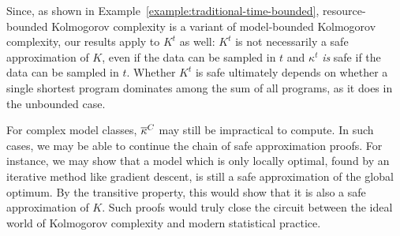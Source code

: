 Since, as shown in Example~\ref{example:traditional-time-bounded}, resource-bounded Kolmogorov complexity is a variant of model-bounded Kolmogorov complexity, our results apply to $K^t$ as well: $K^t$ is not necessarily a safe approximation of $K$, even if the data can be sampled in $t$ and $\kappa^t$ \emph{is} safe if the data can be sampled in $t$. Whether $K^t$ is safe ultimately depends on whether a single shortest program dominates among the sum of all programs, as it does in the unbounded case.


For complex model classes, ${\overline{\kappa}}^C$ may still be impractical to compute. In such cases, we may be able to continue the chain of safe approximation proofs. For instance, we may show that a model which is only locally optimal, found by an iterative method like gradient descent, is still a safe approximation of the global optimum. By the transitive property, this would show that it is also a safe approximation of $K$. Such proofs would truly close the circuit between the ideal world of Kolmogorov complexity and modern statistical practice.

\renewcommand*{\thefootnote}{\fnsymbol{footnote}}


